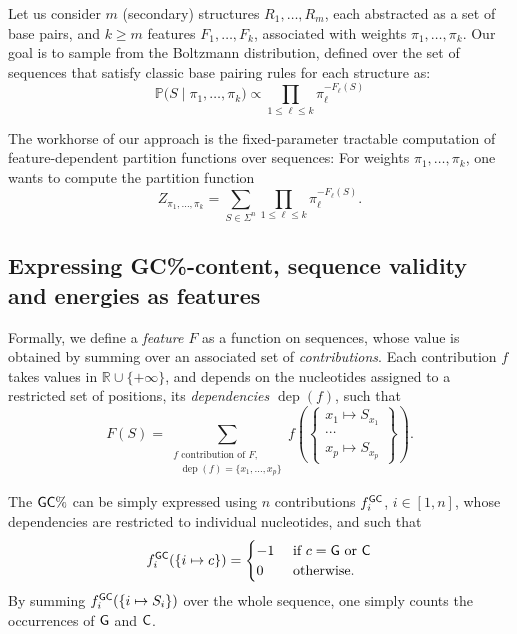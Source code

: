 \documentclass[]{bmcart}
\newcommand{\dep}{\operatorname{dep}}
\newcommand{\partfun}[1]{Z_{#1}}
\newcommand{\Def}[1]{\emph{#1}}
\newcommand{\Nuc}[1]{{\sf #1}}
\newcommand{\Cb}{\Nuc{C}}
\newcommand{\Gb}{\Nuc{G}}
\newcommand{\GCb}{\Gb\Cb}
\renewcommand{\Pr}[1]{\mathbb{P}{#1}}
\newcommand{\revised}[1]{{\color{red} #1}}
\begin{document}
Let us consider $m$ (secondary) structures $R_1,\dots, R_m$, each abstracted as a set of base pairs, and \revised{$k\geq m$} features $F_1,\dots, F_k$, associated with weights $\pi_1,\dots,\pi_k$. Our goal is to sample from the Boltzmann distribution, defined over the set of sequences that satisfy classic base pairing rules for each structure as: 
\begin{equation}
\label{eq:sample-distribution}
\Pr(S\mid\pi_1,\dots,\pi_k) \propto \displaystyle\prod_{1\leq \ell\leq k}\!\! \pi_\ell^{-F_\ell(S)} \end{equation}

The workhorse of our approach is the \revised{fixed-parameter tractable} computation of feature-dependent partition functions over sequences:
For weights $\pi_1,\dots,\pi_k$, one wants to compute the partition function
  \begin{equation}
    \label{eq:mainproblem}
    \partfun{\pi_1,\dots,\pi_k} = \sum_{S\in\Sigma^n} \prod_{1\leq \ell\leq k} \pi_\ell^{-F_\ell(S)}.
  \end{equation}

\subsection*{Expressing \GCb\%-content, sequence validity and energies as features}
Formally, we define a \Def{feature $F$} as a function on sequences, whose value is obtained by summing over an associated set of \Def{contributions}. Each contribution $f$ takes values in $\mathbb{R}\cup \{+\infty\}$, and depends on the nucleotides assigned to a restricted set of positions, its \emph{dependencies $\dep(f)$}, such that
$$
F(S) =\!\!\!\!\!\!\!\sum_{\substack{\text{$f$ contribution of $F$,}\\\text{ $\dep(f)=\{x_1,\ldots,x_p\}$}}}\!\!\!\!\!\! f\left(\left\{\substack{x_1\mapsto S_{x_1}\\\cdots\\x_p\mapsto S_{x_p}}\right\}\right).
$$


The $\GCb\%$ can be simply expressed using $n$ contributions $f^{\GCb}_i$, $i\in[1,n]$, whose dependencies are restricted to individual nucleotides,  and such that 
$$f^{\GCb}_i(\{i\mapsto c\})=\begin{cases}-1&\text{ if }c=\Gb\text{ or }\Cb\\ 0&\text{ otherwise}.\end{cases}$$ 
\revised{By summing $f^{\GCb}_i(\{i\mapsto S_i\})$ over the whole sequence, one simply counts the occurrences of $\Gb$ and $\Cb$.}
\end{document}
